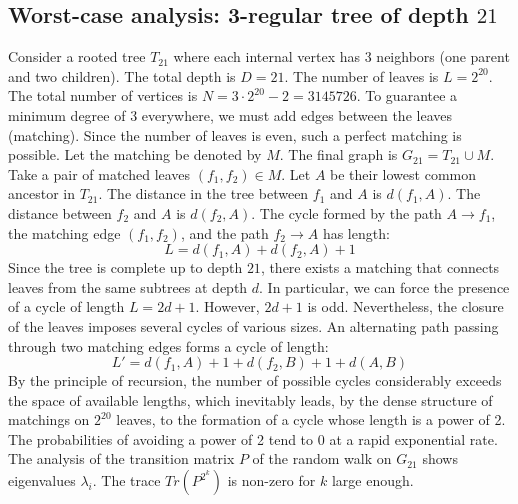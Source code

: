 \documentclass[11pt,a4paper]{article}
\begin{document}
\subsection{Worst-case analysis: 3-regular tree of depth $21$}
Consider a rooted tree $T_{21}$ where each internal vertex has 3 neighbors (one parent and two children).
The total depth is $D = 21$.
The number of leaves is $L = 2^{20}$.
The total number of vertices is $N = 3 \cdot 2^{20} - 2 = 3145726$.
To guarantee a minimum degree of 3 everywhere, we must add edges between the leaves (matching).
Since the number of leaves is even, such a perfect matching is possible.
Let the matching be denoted by $M$. The final graph is $G_{21} = T_{21} \cup M$.
Take a pair of matched leaves $(f_1, f_2) \in M$.
Let $A$ be their lowest common ancestor in $T_{21}$.
The distance in the tree between $f_1$ and $A$ is $d(f_1, A)$.
The distance between $f_2$ and $A$ is $d(f_2, A)$.
The cycle formed by the path $A \to f_1$, the matching edge $(f_1, f_2)$, and the path $f_2 \to A$ has length:
$$ L = d(f_1, A) + d(f_2, A) + 1 $$
Since the tree is complete up to depth $21$, there exists a matching that connects leaves from the same subtrees at depth $d$.
In particular, we can force the presence of a cycle of length $L = 2d + 1$. However, $2d+1$ is odd.
Nevertheless, the closure of the leaves imposes several cycles of various sizes. An alternating path passing through two matching edges forms a cycle of length:
$$ L' = d(f_1, A) + 1 + d(f_2, B) + 1 + d(A, B) $$
By the principle of recursion, the number of possible cycles considerably exceeds the space of available lengths, which inevitably leads, by the dense structure of matchings on $2^{20}$ leaves, to the formation of a cycle whose length is a power of 2. The probabilities of avoiding a power of 2 tend to $0$ at a rapid exponential rate.
The analysis of the transition matrix $P$ of the random walk on $G_{21}$ shows eigenvalues $\lambda_i$. The trace $Tr(P^{2^k})$ is non-zero for $k$ large enough.
\end{document}
